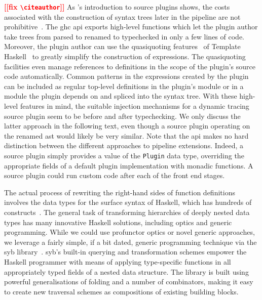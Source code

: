 \documentclass[thesis=B,english]{FITthesis}[2019/12/23]
\newcommand{\todo}[1]{\textcolor{red}{\textbf{[[#1]]}}}
\newcommand{\hsType}[1]{\texttt{#1}}
\begin{document}
\todo{fix \texttt{\textbackslash citeauthor}}
As \citeauthor{blog-source-plugins}'s introduction to source plugins shows, the
costs associated with the construction of syntax trees later in the pipeline
are not prohibitive~\cite{blog-source-plugins}. The \acrshort{ghc}
\acrshort{api} exports high-level functions which let the plugin author take
trees from parsed to renamed to typechecked in only a few lines of code.
Moreover, the plugin author can use the quasi\-quoting
features~\cite{th-quasiquoting} of Template Haskell~\cite{th-classic} to greatly
simplify the construction of expressions. The quasi\-quoting facilities even
manage references to definitions in the scope of the plugin's source code
automatically. Common patterns in the expressions created by the plugin can be
included as regular top-level definitions in the plugin's module or in a module
the plugin depends on and spliced into the syntax tree. With these high-level
features in mind, the suitable injection mechanisms for a dynamic tracing
source plugin seem to be before and after typechecking. We only discuss the
latter approach in the following text, even though a source plugin operating on
the renamed \acrshort{ast} would likely be very similar. Note that the
\acrshort{api} makes no hard distinction between the different approaches to
pipeline extensions. Indeed, a source plugin simply provides a value of the
\hsType{Plugin} data type, overriding the appropriate fields of a default
plugin implementation with monadic functions. A source plugin could run custom
code after each of the front end stages.

The actual process of rewriting the right-hand sides of function definitions
involves the data types for the surface syntax of Haskell, which has hundreds
of constructs~\cite[Key~Design~Choices]{arch-ghc}. The general task of
transforming hierarchies of deeply nested data types has many innovative
Haskell solutions, including optics and generic programming. While we could use
pro\-functor optics or novel generic approaches, we leverage a fairly simple,
if a bit dated, generic programming technique via the \acrfull{syb}
library~\cite{syb-paper}. \acrshort{syb}'s built-in querying and transformation
schemes empower the Haskell programmer with means of applying type-specific
functions in all appropriately typed fields of a nested data structure. The
library is built using powerful generalisations of folding and a number of
combinators, making it easy to create new traversal schemes as compositions of
existing building blocks.
\end{document}
